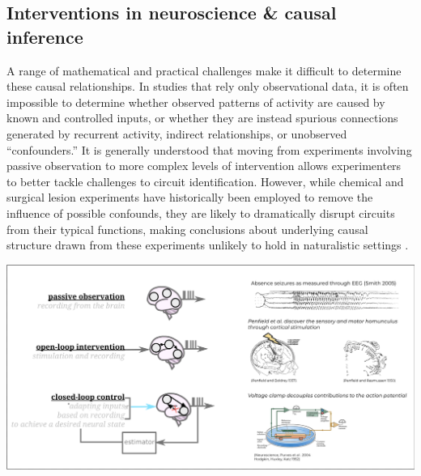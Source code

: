 \documentclass{article}
\begin{document}
\hypertarget{interventions-in-neuroscience-causal-inference}{%
\subsection{Interventions in neuroscience \& causal inference}\label{interventions-in-neuroscience-causal-inference}}

A range of mathematical and practical challenges make it difficult to determine these causal relationships. In studies that rely only observational data, it is often impossible to determine whether observed patterns of activity are caused by known and controlled inputs, or whether they are instead spurious connections generated by recurrent activity, indirect relationships, or unobserved ``confounders.'' It is generally understood that moving from experiments involving passive observation to more complex levels of intervention allows experimenters to better tackle challenges to circuit identification. However, while chemical and surgical lesion experiments have historically been employed to remove the influence of possible confounds, they are likely to dramatically disrupt circuits from their typical functions, making conclusions about underlying causal structure drawn from these experiments unlikely to hold in naturalistic settings
\autocite{chicharro2012when}.

\includegraphics[width=1.0\textwidth]{figures/core_figure_sketches/figure1_sketch.png}
\end{document}
